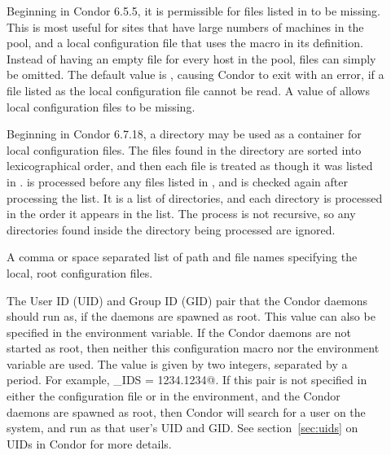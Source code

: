\begin{description}
\item[] \label{param:RequireLocalConfigFile}
  Beginning in Condor 6.5.5, it is permissible for files listed 
  in 
  to be missing. This is most useful for sites that have 
  large numbers of machines in the pool, and a local configuration file
  that uses
  the  macro in its definition.
  Instead of having an empty file for every host
  in the pool, files can simply be omitted.
  The default value is ,
  causing Condor to exit with an error, if a file listed as the local 
  configuration file cannot be read.
  A value of  allows local configuration files to be missing.

\item[] \label{param:LocalConfigDir} 
  Beginning in Condor 6.7.18, a directory may be used as a container for 
  local configuration files. 
  The files found in the directory are sorted into lexicographical order, and 
  then each file is treated as though it was listed in 
  . 
   is processed before any files listed in 
  , and is checked again after processing
  the  list. 
  It is a list of directories, and each directory is processed in the order
  it appears in the list. 
  The process is not recursive, so any directories found inside the directory
  being processed are ignored. 

\item[] \label{param:LocalRootConfigFile} 
  A comma or space separated list of path and file names specifying
  the local, root configuration files.

\item[] \label{param:CondorIds}
  The User ID (UID) and Group ID (GID) pair that the Condor daemons
  should run as, if the daemons are spawned as root.
  This value can also be specified in the 
  environment variable.
  If the Condor daemons are not started as root, then neither this
   configuration macro nor the 
  environment variable are used.
  The value is given by two integers, separated by a period.  For
  example, \verb@CONDOR_IDS = 1234.1234@.
  If this pair is not specified in either the configuration file or in the
  environment, and the Condor daemons are spawned as root,
  then Condor will
  search for a \verb@condor@ user on the system, and run as that user's
  UID and GID.
  See section~\ref{sec:uids} on UIDs in Condor for more details.


\end{description}
